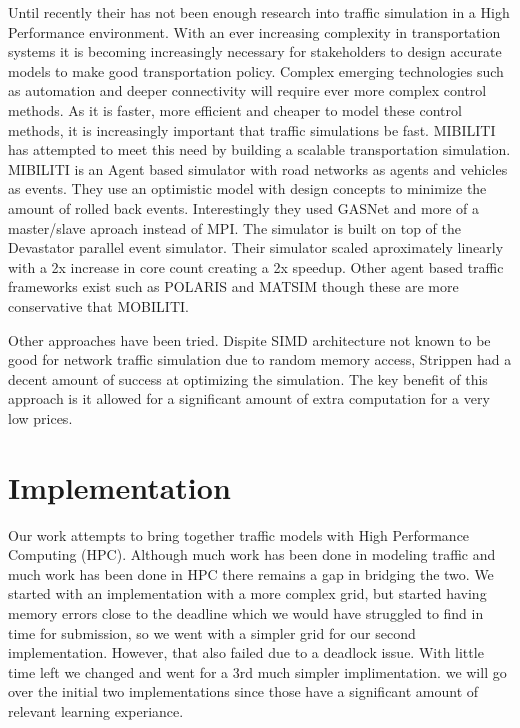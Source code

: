 \documentclass[10pt,a4paper]{article}
\begin{document}
Until recently their has not been enough research into traffic simulation in a High Performance environment. With an ever increasing complexity in transportation systems it is becoming increasingly necessary for stakeholders to design accurate models to make good transportation policy. Complex emerging technologies such as automation and deeper connectivity will require ever more complex control methods. As it is faster, more efficient and cheaper to model these control methods, it is increasingly important that traffic simulations be fast. MIBILITI \cite{MOBILIT:2018} has attempted to meet this need by building a scalable transportation simulation. MIBILITI is an Agent based simulator with road networks as agents and vehicles as events. They use an optimistic model with design concepts to minimize the amount of rolled back events. Interestingly they used GASNet and more of a master/slave aproach instead of MPI. The simulator is built on top of the Devastator parallel event simulator. Their simulator scaled aproximately linearly with a 2x increase in core count creating a 2x speedup. Other agent based traffic frameworks exist such as POLARIS \cite{SOKOLOV2012854} and MATSIM \cite{Waraich2015} though these are more conservative that MOBILITI.

Other approaches have been tried. Dispite SIMD architecture not known to be good for network traffic simulation due to random memory access, Strippen \cite{Strippgen:2009}had a decent amount of success at optimizing the simulation. The key benefit of this approach is it allowed for a significant amount of extra computation for a very low prices.
\section{Implementation}

Our work attempts to bring together traffic models with High Performance Computing (HPC). Although much work has been done in modeling traffic and much work has been done in HPC there remains a gap in bridging the two. We started with an implementation with a more complex grid, but started having memory errors close to the deadline which we would have struggled to find in time for submission, so we went with a simpler grid for our second implementation. However, that also failed due to a deadlock issue. With little time left we changed and went for a 3rd much simpler implimentation. we will go over the initial two implementations since those have a significant amount of relevant learning experiance.
\end{document}
